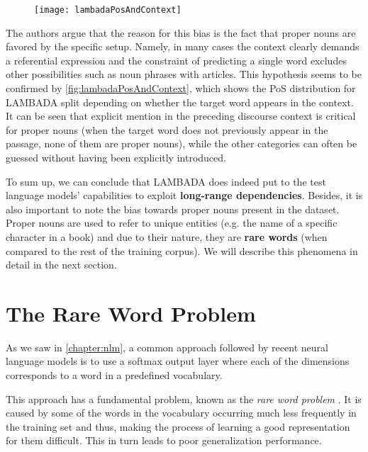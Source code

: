 \begin{figure}[H]
	\centering
	\texttt{[image: lambadaPosAndContext]}
	\label{fig:lambadaPosAndContext}
\end{figure}

The authors argue that the reason for this bias is the fact that proper nouns are favored by the specific setup. Namely, in many cases the context clearly demands a referential expression and the constraint of predicting a single word excludes other possibilities such as noun phrases with articles. This hypothesis seems to be confirmed by \autoref{fig:lambadaPosAndContext}, which shows the PoS distribution for LAMBADA split depending on whether the target word appears in the context. It can be seen that explicit mention in the preceding discourse context is critical for proper nouns (when the target word does not previously appear in the passage, none of them are proper nouns), while the other categories can often be guessed without having been explicitly introduced.

To sum up, we can conclude that LAMBADA does indeed put to the test language models' capabilities to exploit \textbf{long-range dependencies}. Besides, it is also important to note the bias towards proper nouns present in the dataset. Proper nouns are used to refer to unique entities (e.g. the name of a specific character in a book) and due to their nature, they are \textbf{rare words} (when compared to the rest of the training corpus). We will describe this phenomena in detail in the next section.

\section{The Rare Word Problem}
\label{sec:problemRare}

As we saw in \autoref{chapter:nlm}, a common approach followed by recent neural language models is to use a softmax output layer where each of the dimensions corresponds to a word in a predefined vocabulary.

This approach has a fundamental problem, known as the \textit{rare word problem} \cite{merity2016pointer}. It is caused by some of the words in the vocabulary occurring much less frequently in the training set and thus, making the process of learning a good representation for them difficult. This in turn leads to poor generalization performance. 

